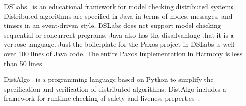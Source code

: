 \documentclass[twocolumn]{article}
\begin{document}
DSLabs~\cite{MWA19} is an educational framework for model checking distributed
systems.  Distributed algorithms are specified in Java in terms of
nodes, messages, and timers in an event-driven style.  DSLabs does not
support model checking sequential or concurrent programs.  Java
also has the disadvantage that it is a verbose language.  Just the
boilerplate for the Paxos project in DSLabs is well over 100 lines
of Java code.  The entire Paxos implementation in Harmony is less
than 50 lines.

Dist\-Algo~\cite{DistAlgo} is a programming language based on Python to
simplify the specification and verification of distributed algorithms.
Dist\-Algo includes a framework for runtime checking of safety and liveness
properties~\cite{LS20}.



\end{document}
